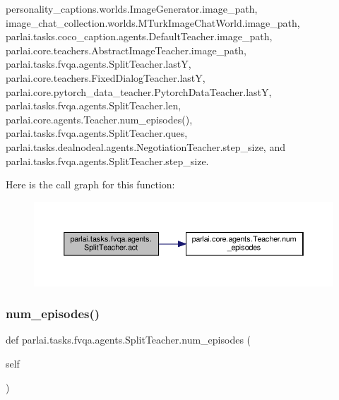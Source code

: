 personality\+\_\+captions.\+worlds.\+Image\+Generator.\+image\+\_\+path, image\+\_\+chat\+\_\+collection.\+worlds.\+M\+Turk\+Image\+Chat\+World.\+image\+\_\+path, parlai.\+tasks.\+coco\+\_\+caption.\+agents.\+Default\+Teacher.\+image\+\_\+path, parlai.\+core.\+teachers.\+Abstract\+Image\+Teacher.\+image\+\_\+path, parlai.\+tasks.\+fvqa.\+agents.\+Split\+Teacher.\+lastY, parlai.\+core.\+teachers.\+Fixed\+Dialog\+Teacher.\+lastY, parlai.\+core.\+pytorch\+\_\+data\+\_\+teacher.\+Pytorch\+Data\+Teacher.\+lastY, parlai.\+tasks.\+fvqa.\+agents.\+Split\+Teacher.\+len, parlai.\+core.\+agents.\+Teacher.\+num\+\_\+episodes(), parlai.\+tasks.\+fvqa.\+agents.\+Split\+Teacher.\+ques, parlai.\+tasks.\+dealnodeal.\+agents.\+Negotiation\+Teacher.\+step\+\_\+size, and parlai.\+tasks.\+fvqa.\+agents.\+Split\+Teacher.\+step\+\_\+size.

Here is the call graph for this function\+:
\nopagebreak
\begin{figure}[H]
\begin{center}
\leavevmode
\includegraphics[width=350pt]{classparlai_1_1tasks_1_1fvqa_1_1agents_1_1SplitTeacher_a0c33987105d52a1f21c79d9ee9e71b56_cgraph}
\end{center}
\end{figure}
\mbox{\label{classparlai_1_1tasks_1_1fvqa_1_1agents_1_1SplitTeacher_afb8c188440f9aa2721a308969380f2bc}} 
\subsubsection{\texorpdfstring{num\+\_\+episodes()}{num\_episodes()}}
{\footnotesize\ttfamily def parlai.\+tasks.\+fvqa.\+agents.\+Split\+Teacher.\+num\+\_\+episodes (\begin{DoxyParamCaption}\item[{}]{self }\end{DoxyParamCaption})}



